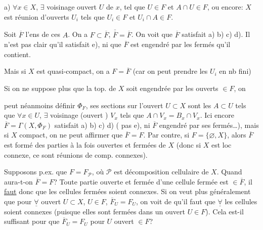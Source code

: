 a) $\forall x\in X$, $\exists$ voisinage ouvert $U$ de $x$, tel que $U\in F$ et $A\cap U\in F$, ou encore: $X$ est réunion d'ouverts $U_i$ tels que $U_i\in F$ et $U_i\cap A\in F$.

Soit $\overline F$ l'ens de ces $A$. On a $F\subset\overline F$, $\overline{\overline F}=\overline F$. On voit que $\overline F$ satisfait a) b) c) d).  Il n'est pas clair qu'il satisfait e),  ni que $\overline F$ est engendré par les fermés qu'il contient.

Mais si $X$ est quasi-compact, on a $F=\overline F$ (car on peut prendre les $U_i$ en nb fini)

Si on ne suppose plus que la top. de $X$ soit engendrée par les ouverts $\in F$, on

peut néanmoins définir $\Phi_F$, ses sections sur l'ouvert $U\subset X$ sont les $A\subset U$ tels que $\forall x\in U$, $\exists$ voisinage (ouvert ) $V_x$  tels que $A\cap V_x=B_x\cap V_x$. Ici encore $\overline F=\Gamma(X,\Phi_F)$  satisfait a) b) c) d) ( pas e), ni $\overline F$ engendré par ses fermés\ldots), mais  si $X$ compact, on ne peut affirmer que  $\overline F=F$. Par contre, si $F=\{\varnothing,X\}$, alors $\overline F$ est formé des parties à la fois ouvertes et fermées de $X$ (donc si $X$ est loc connexe, ce sont  réunions de comp. connexes).


Supposons p.ex. que $F=F_{\mathcal P}$, où $\mathcal P$ est décomposition cellulaire de $X$. Quand aura-t-on $\overline F=F$? Toute partie ouverte et fermée d'une cellule fermée est $\in\overline F$, il \uline{faut} donc que les cellules fermées soient connexes. Si on veut plus généralement que pour $\underline{\forall}$ ouvert $U\subset X$, $U\in F$, $\overline F_U=F_U$, on voit de  qu'il faut que $\underline{\forall}$ les cellules soient connexes (puisque elles sont fermées dans un ouvert $U\in F$). Cela est-il suffisant pour que $\overline F_U=F_U$ pour  $U$ ouvert $\in F$?

